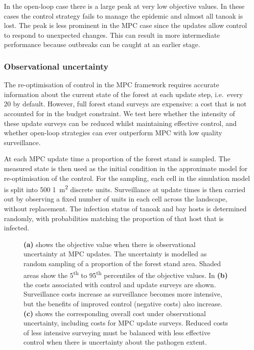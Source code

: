 In the open-loop case there is a large peak at very low objective values. In these cases the control strategy fails to manage the epidemic and almost all tanoak is lost. The peak is less prominent in the MPC case since the updates allow control to respond to unexpected changes. This can result in more intermediate performance because outbreaks can be caught at an earlier stage.

\FloatBarrier
\subsubsection{Observational uncertainty}

The re-optimisation of control in the MPC framework requires accurate information about the current state of the forest at each update step, i.e.\ every \SI{20}{\years} by default. However, full forest stand surveys are expensive: a cost that is not accounted for in the budget constraint. We test here whether the intensity of these update surveys can be reduced whilst maintaining effective control, and whether open-loop strategies can ever outperform MPC with low quality surveillance.

At each MPC update time a proportion of the forest stand is sampled. The measured state is then used as the initial condition in the approximate model for re-optimisation of the control. For the sampling, each cell in the simulation model is split into 500 \SI{1}{\meter\squared} discrete units. Surveillance at update times is then carried out by observing a fixed number of units in each cell across the landscape, without replacement. The infection status of tanoak and bay hosts is determined randomly, with probabilities matching the proportion of that host that is infected.

\begin{figure}[t]
    \begin{center}
        \caption[Performance of MPC under observational uncertainty]{\textbf{(a)} shows the objective value when there is observational uncertainty at MPC updates. The uncertainty is modelled as random sampling of a proportion of the forest stand area. Shaded areas show the 5\textsuperscript{th} to 95\textsuperscript{th} percentiles of the objective values. In \textbf{(b)} the costs associated with control and update surveys are shown. Surveillance costs increase as surveillance becomes more intensive, but the benefits of improved control (negative costs) also increase. \textbf{(c)} shows the corresponding overall cost under observational uncertainty, including costs for MPC update surveys. Reduced costs of less intensive surveying must be balanced with less effective control when there is uncertainty about the pathogen extent.\label{fig:ch6:obs_uncert}}
    \end{center}
\end{figure}

